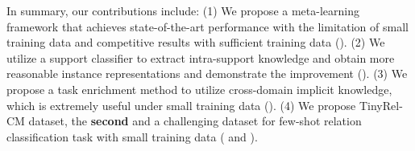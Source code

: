 In summary, our contributions include:
 (1) We propose a meta-learning framework that achieves state-of-the-art performance with the limitation of small training data and competitive results with sufficient training data ().
(2) We utilize a support classifier to extract intra-support knowledge and
obtain more reasonable instance representations and demonstrate the improvement ().
(3) We propose a task enrichment method to utilize cross-domain implicit knowledge, which is extremely useful under small training data ().
(4) We propose TinyRel-CM dataset,
the {\bf second} and a challenging dataset for few-shot relation classification task with small training data ( and ).

